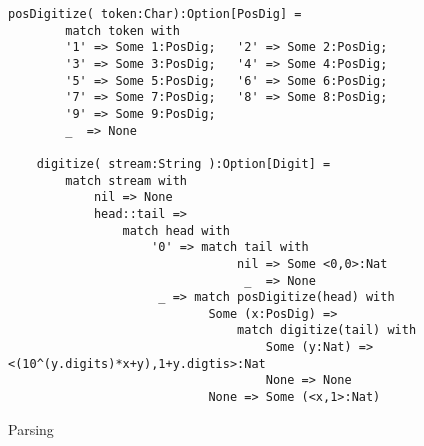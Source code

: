 \begin{lstfloat}
    \begin{lstlisting}[language=Hidris]
    posDigitize( token:Char):Option[PosDig] =
        match token with
        '1' => Some 1:PosDig;   '2' => Some 2:PosDig;   
        '3' => Some 3:PosDig;   '4' => Some 4:PosDig;   
        '5' => Some 5:PosDig;   '6' => Some 6:PosDig;
        '7' => Some 7:PosDig;   '8' => Some 8:PosDig;   
        '9' => Some 9:PosDig;
        _  => None
    
    digitize( stream:String ):Option[Digit] =
        match stream with 
            nil => None
            head::tail => 
                match head with 
                    '0' => match tail with 
                                nil => Some <0,0>:Nat
                                 _  => None
                     _ => match posDigitize(head) with 
                            Some (x:PosDig) => 
                                match digitize(tail) with 
                                    Some (y:Nat) => <(10^(y.digits)*x+y),1+y.digtis>:Nat
                                    None => None
                            None => Some (<x,1>:Nat)
    \end{lstlisting}
    \caption{Parsing}
    \end{lstfloat}
    




